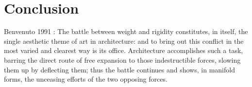 \chapter*{Conclusion}

Benvenuto 1991 : The battle between weight and rigidity constitutes, in itself, the single aesthetic theme of art in architecture: and to bring out this conflict in the most varied and clearest way is its office. Architecture accomplishes such a task, barring the direct route of free expansion to those indestructible forces, slowing them up by deflecting them; thus the battle continues and shows, in manifold forms, the unceasing efforts of the two opposing forces.